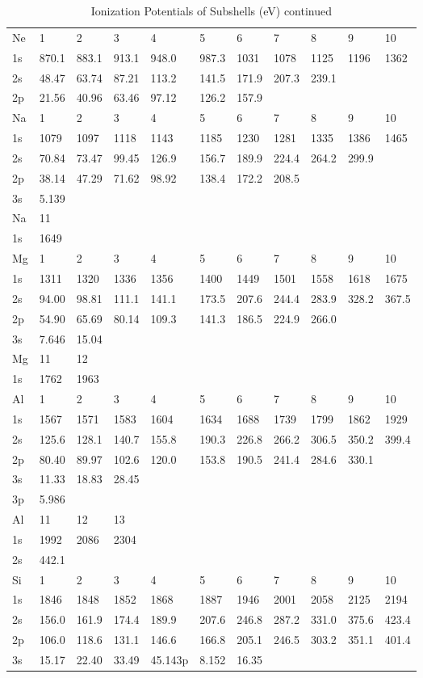 \begin{table}
\caption{Ionization Potentials of Subshells (eV) continued}
\begin{tabular}{lllllllllll}
\hline
Ne&   1&   2&   3&   4&   5&   6&   7&   8&   9&  10\\
1s& 870.1& 883.1& 913.1& 948.0& 987.3&
1031&  1078&  1125&  1196&  1362\\
2s& 48.47& 63.74& 87.21& 113.2& 141.5& 171.9& 207.3&
239.1\\
2p& 21.56& 40.96& 63.46& 97.12& 126.2& 157.9\\
\hline
Na&   1&   2&   3&   4&   5&   6&
7&   8&   9&  10\\
\hline
1s&  1079&  1097&  1118&  1143&  1185&  1230&  1281&  1335&  1386&  1465\\
2s&
70.84& 73.47& 99.45& 126.9& 156.7& 189.9& 224.4& 264.2& 299.9\\
2p& 38.14& 47.29& 71.62&
98.92& 138.4& 172.2& 208.5\\
3s& 5.139\\
\hline
Na&  11\\
\hline
1s&  1649\\
\hline
Mg&   1&   2&   3&   4&   5&   6&
7&   8&   9&  10\\
\hline
1s&  1311&  1320&  1336&  1356&  1400&  1449&  1501&  1558&  1618&  1675\\
2s&
94.00& 98.81& 111.1& 141.1& 173.5& 207.6& 244.4& 283.9& 328.2& 367.5\\
2p& 54.90& 65.69&
80.14& 109.3& 141.3& 186.5& 224.9& 266.0\\
3s& 7.646& 15.04\\
\hline
Mg&  11&  12\\
\hline
1s&  1762&  1963\\
\hline
Al&
1&   2&   3&   4&   5&   6&   7&   8&   9&  10\\
\hline
1s&  1567&  1571&  1583&  1604&  1634&  1688&
1739&  1799&  1862&  1929\\
2s& 125.6& 128.1& 140.7& 155.8& 190.3& 226.8& 266.2& 306.5&
350.2& 399.4\\
2p& 80.40& 89.97& 102.6& 120.0& 153.8& 190.5& 241.4& 284.6& 330.1\\
3s& 11.33&
18.83& 28.45\\
3p& 5.986\\
\hline
Al&  11&  12&  13\\
\hline
1s&  1992&  2086&  2304\\
2s& 442.1\\
\hline
Si& 1&   2&
3&   4&   5&   6&   7&   8&   9&  10\\
\hline
1s&  1846&  1848&  1852&  1868&  1887&  1946&  2001&
2058&  2125&  2194\\
2s& 156.0& 161.9& 174.4& 189.9& 207.6& 246.8& 287.2& 331.0& 375.6&
423.4\\
2p& 106.0& 118.6& 131.1& 146.6& 166.8& 205.1& 246.5& 303.2& 351.1& 401.4\\
3s& 15.17&
22.40& 33.49& 45.143p& 8.152& 16.35\\
\hline
\end{tabular}
\end{table}



